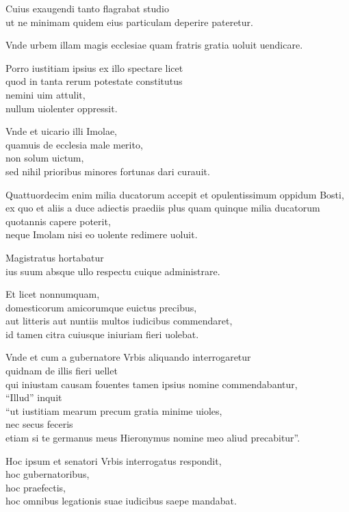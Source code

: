 \documentclass[a5paper,twoside]{article}
\begin{document}
Cuius exaugendi tanto flagrabat studio \\
ut ne minimam quidem eius particulam deperire pateretur. 

Vnde urbem illam magis ecclesiae quam fratris gratia uoluit uendicare.

Porro iustitiam ipsius ex illo spectare licet \\
quod in tanta rerum potestate constitutus \\
nemini uim attulit, \\
nullum uiolenter oppressit. 

Vnde et uicario illi Imolae, \\
quamuis de ecclesia male merito, \\
non solum uictum, \\
sed nihil prioribus minores fortunas dari curauit. 

Quattuordecim enim milia ducatorum accepit et opulentissimum oppidum Bosti, \\
ex quo et aliis a duce adiectis praediis plus quam quinque milia ducatorum quotannis capere poterit, \\
neque Imolam nisi eo uolente redimere uoluit. 

Magistratus hortabatur \\
ius suum absque ullo respectu cuique administrare.  

Et licet nonnumquam, \\
domesticorum amicorumque euictus precibus, \\
aut litteris aut nuntiis multos iudicibus commendaret, \\
id tamen citra cuiusque iniuriam fieri uolebat. 

Vnde et cum a gubernatore Vrbis aliquando interrogaretur \\
quidnam de illis fieri uellet \\
qui iniustam causam fouentes tamen ipsius nomine commendabantur, \\
``Illud'' inquit \\
``ut iustitiam mearum precum gratia minime uioles, \\
nec secus feceris \\
etiam si te germanus meus Hieronymus nomine meo aliud precabitur''.  

Hoc ipsum et senatori Vrbis interrogatus respondit, \\
hoc gubernatoribus, \\
hoc praefectis, \\
hoc omnibus legationis suae iudicibus saepe mandabat.  
\end{document}
